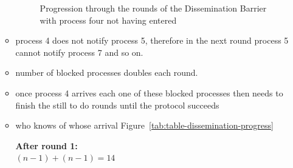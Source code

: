 \documentclass[a4paper, 10pt]{article}
\begin{document}
\begin{itemize}
\begin{itemize}
				\begin{figure}[htbp]
					\centering
					
					\caption{Progression through the rounds of the Dissemination Barrier with process four not having entered}
					\label{fig:diagram-dissemination-progress}
				\end{figure}
			\item process 4 does not notify process 5, therefore in the next round process 5 cannot notify process 7 and so on.
			\item number of blocked processes doubles each round.
			\item once process 4 arrives each one of these blocked processes then needs to finish the still to do rounds until the protocol succeeds
			\item who knows of whose arrival Figure~\ref{tab:table-dissemination-progress}
				\begin{table}[htbp]
					\centering
					\caption{Which process knows of which other's arrival}
					\vspace{0.2cm}
					\begin{minipage}{0.42\linewidth}
						\textbf{After round 1:} \\
						$(n-1) + (n-1) = 14$ \\
						\vspace{-0.1cm} \\
\end{minipage}
\end{table}
\end{itemize}
\end{itemize}
\end{document}

